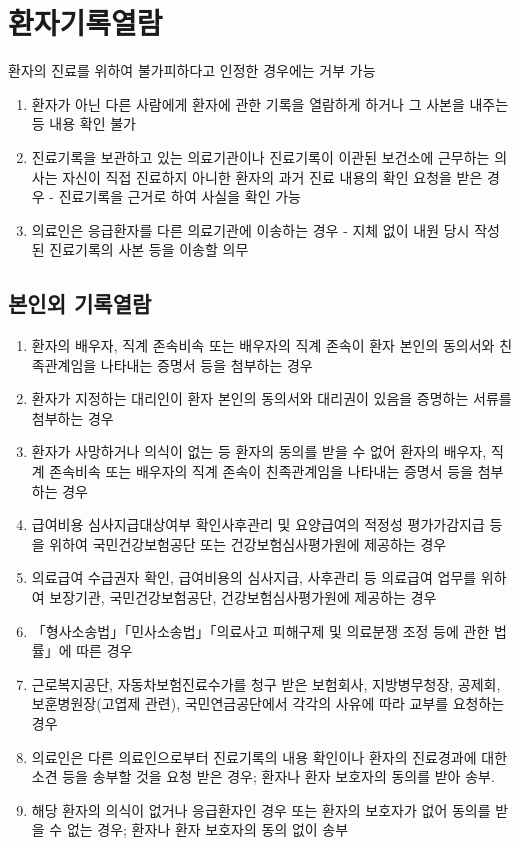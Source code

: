 ﻿\section{환자기록열람}
환자의 진료를 위하여 불가피하다고 인정한 경우에는 거부 가능 
\begin{enumerate}\tightlist
\item 환자가 아닌 다른 사람에게 환자에 관한 기록을 열람하게 하거나 그 사본을 내주는 등 내용 확인 불가
\item 진료기록을 보관하고 있는 의료기관이나 진료기록이 이관된 보건소에 근무하는 의사는 자신이 직접 진료하지 아니한 환자의 과거 진료 내용의 확인 요청을 받은 경우 - 진료기록을 근거로 하여 사실을 확인 가능
\item 의료인은 응급환자를 다른 의료기관에 이송하는 경우 - 지체 없이 내원 당시 작성된 진료기록의 사본 등을 이송할 의무
\end{enumerate}
\subsection{본인외 기록열람}
\begin{enumerate}\tightlist
\item 환자의 배우자, 직계 존속\cntrdot{}비속 또는 배우자의 직계 존속이 환자 본인의 동의서와 친족관계임을 나타내는 증명서 등을 첨부하는 경우
\item 환자가 지정하는 대리인이 환자 본인의 동의서와 대리권이 있음을 증명하는 서류를 첨부하는 경우
\item 환자가 사망하거나 의식이 없는 등 환자의 동의를 받을 수 없어 환자의 배우자, 직계 존속\cntrdot{}비속 또는 배우자의 직계 존속이 친족관계임을 나타내는 증명서 등을 첨부하는 경우
\item 급여비용 심사\cntrdot{}지급\cntrdot{}대상여부 확인\cntrdot{}사후관리 및 요양급여의 적정성 평가\cntrdot{}가감지급 등을 위하여 국민건강보험공단 또는 건강보험심사평가원에 제공하는 경우
\item 의료급여 수급권자 확인, 급여비용의 심사\cntrdot{}지급, 사후관리 등 의료급여 업무를 위하여 보장기관, 국민건강보험공단, 건강보험심사평가원에 제공하는 경우
\item 「형사소송법」「민사소송법」「의료사고 피해구제 및 의료분쟁 조정 등에 관한 법률」에 따른 경우
\item 근로복지공단, 자동차보험진료수가를 청구 받은 보험회사, 지방병무청장, 공제회, 보훈병원장(고엽제 관련), 국민연금공단에서 각각의 사유에 따라 교부를 요청하는 경우
\item  의료인은 다른 의료인으로부터 진료기록의 내용 확인이나 환자의 진료경과에 대한 소견 등을 송부할 것을 요청 받은 경우; 환자나 환자 보호자의 동의를 받아 송부.
\item 해당 환자의 의식이 없거나 응급환자인 경우 또는 환자의 보호자가 없어 동의를 받을 수 없는 경우; 환자나 환자 보호자의 동의 없이 송부
\end{enumerate}

